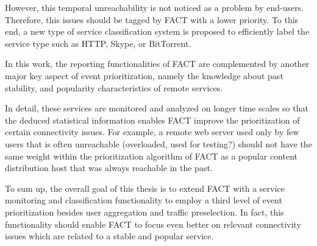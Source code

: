 \documentclass{sigcomm-alternate}
\begin{document}
However, this temporal unreachability is not noticed as a problem by end-users.
Therefore, this issues should be tagged by FACT with a lower priority.
To this end, a new type of service classification system is proposed to efficiently
label the service type such as HTTP, Skype, or BitTorrent.

In this work, the reporting functionalities of FACT are complemented by
another major key aspect of event prioritization, namely the knowledge
about past stability, and popularity characteristics of remote services.

In detail, these services are monitored and analyzed on longer time scales
so that the deduced statistical information enables FACT improve
the prioritization of certain connectivity issues. For example, a
remote web server used only by few users that is often unreachable
(overloaded, used for testing?) should not have the same weight within
the prioritization algorithm of FACT as a popular content distribution
host that was always reachable in the past.


%
%
To sum up, the overall goal of this thesis is to extend FACT with
a service monitoring and classification functionality to employ a
third level of event prioritization besides user aggregation and traffic
preselection. In fact, this functionality should enable FACT to focus
even better on relevant connectivity issues which are related to a stable
and popular service.
\end{document}
